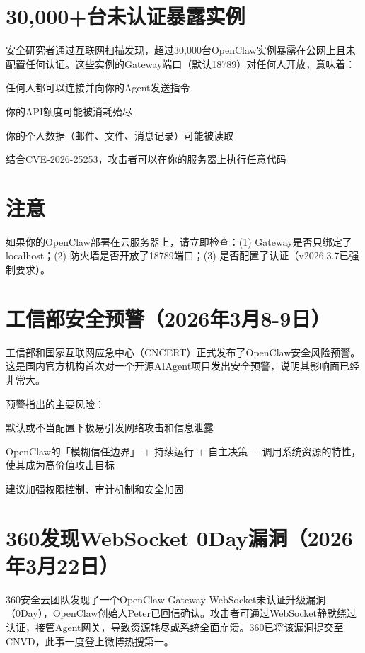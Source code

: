 \documentclass[
  10
]{article}
\begin{document}
\section{30,000+台未认证暴露实例}\label{ux53f0ux672aux8ba4ux8bc1ux66b4ux9732ux5b9eux4f8b}

安全研究者通过互联网扫描发现，超过30,000台OpenClaw实例暴露在公网上且未配置任何认证。这些实例的Gateway端口（默认18789）对任何人开放，意味着：

任何人都可以连接并向你的Agent发送指令

你的API额度可能被消耗殆尽

你的个人数据（邮件、文件、消息记录）可能被读取

结合CVE-2026-25253，攻击者可以在你的服务器上执行任意代码

\section{注意}\label{ux6ce8ux610f-24}

如果你的OpenClaw部署在云服务器上，请立即检查：(1)
Gateway是否只绑定了localhost；(2) 防火墙是否开放了18789端口；(3)
是否配置了认证（v2026.3.7已强制要求）。

\section{工信部安全预警（2026年3月8-9日）}\label{ux5de5ux4fe1ux90e8ux5b89ux5168ux9884ux8b662026ux5e743ux67088-9ux65e5}

工信部和国家互联网应急中心（CNCERT）正式发布了OpenClaw安全风险预警。这是国内官方机构首次对一个开源AIAgent项目发出安全预警，说明其影响面已经非常大。

预警指出的主要风险：

默认或不当配置下极易引发网络攻击和信息泄露

OpenClaw的「模糊信任边界」 \(+\) 持续运行 \(+\) 自主决策 \(+\)
调用系统资源的特性，使其成为高价值攻击目标

建议加强权限控制、审计机制和安全加固

\section{360发现WebSocket
0Day漏洞（2026年3月22日）}\label{ux53d1ux73b0websocket-0dayux6f0fux6d1e2026ux5e743ux670822ux65e5}

360安全云团队发现了一个OpenClaw Gateway
WebSocket未认证升级漏洞（0Day），OpenClaw创始人Peter已回信确认。攻击者可通过WebSocket静默绕过认证，接管Agent网关，导致资源耗尽或系统全面崩溃。360已将该漏洞提交至CNVD，此事一度登上微博热搜第一。
\end{document}
